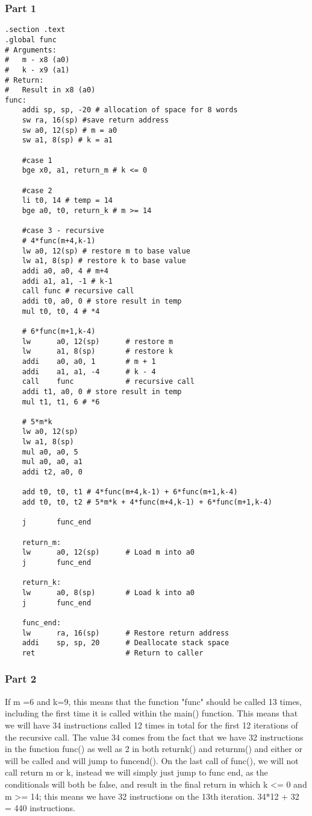 \documentclass[11pt]{article}
\begin{document}
\subsubsection*{Part 1}
\begin{lstlisting}
.section .text
.global func
# Arguments:
#   m - x8 (a0)
#   k - x9 (a1)
# Return:
#   Result in x8 (a0)
func:
	addi sp, sp, -20 # allocation of space for 8 words
	sw ra, 16(sp) #save return address 
	sw a0, 12(sp) # m = a0
	sw a1, 8(sp) # k = a1
	
	#case 1
	bge x0, a1, return_m # k <= 0
	
	#case 2
	li t0, 14 # temp = 14
	bge a0, t0, return_k # m >= 14
	
	#case 3 - recursive
	# 4*func(m+4,k-1)
	lw a0, 12(sp) # restore m to base value
	lw a1, 8(sp) # restore k to base value
	addi a0, a0, 4 # m+4
	addi a1, a1, -1 # k-1
	call func # recursive call
	addi t0, a0, 0 # store result in temp
	mul t0, t0, 4 # *4

	# 6*func(m+1,k-4)
	lw      a0, 12(sp)      # restore m
	lw      a1, 8(sp)       # restore k
	addi    a0, a0, 1       # m + 1
	addi    a1, a1, -4      # k - 4
	call    func            # recursive call
	addi t1, a0, 0 # store result in temp
	mul t1, t1, 6 # *6
	
	# 5*m*k
	lw a0, 12(sp)
	lw a1, 8(sp)
	mul a0, a0, 5
	mul a0, a0, a1
	addi t2, a0, 0
	
	add t0, t0, t1 # 4*func(m+4,k-1) + 6*func(m+1,k-4)
	add t0, t0, t2 # 5*m*k + 4*func(m+4,k-1) + 6*func(m+1,k-4)
	
	j       func_end
	
	return_m:
	lw      a0, 12(sp)      # Load m into a0
	j       func_end
	
	return_k:
	lw      a0, 8(sp)       # Load k into a0
	j 		func_end
	
	func_end:
	lw      ra, 16(sp)      # Restore return address
	addi    sp, sp, 20      # Deallocate stack space
	ret                     # Return to caller
\end{lstlisting} 
\subsubsection*{Part 2}
If m =6 and k=9, this means that the function "func" should be called 13 times, including the first time it is called within the main() function. This means that we will have 34 instructions called 12 times in total for the first 12 iterations of the recursive call. The value 34 comes from the fact that we have 32 instructions in the function func() as well as 2 in both returnk() and returnm() and either or will be called and will jump to funcend().  On the last call of func(), we will not call return m or k, instead we will simply just jump to func end, as the conditionals will both be false, and result in the final return in which k <= 0 and m >= 14; this means we have 32 instructions on the 13th iteration. 34*12 + 32 = 440 instructions. 
\end{document}

